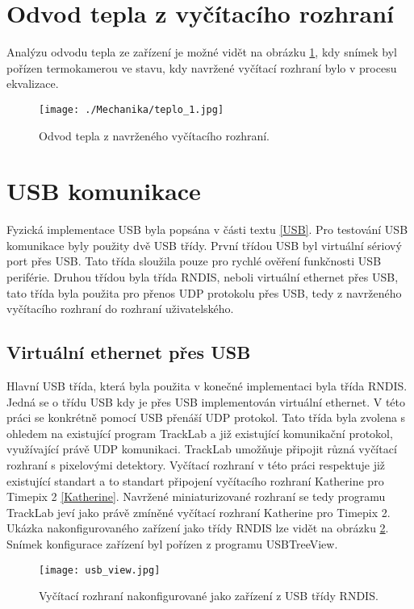 \section{Odvod tepla z vyčítacího rozhraní}
Analýzu odvodu tepla ze zařízení je možné vidět na obrázku \ref{fig:teplo}, kdy snímek byl pořízen termokamerou ve stavu, kdy navržené vyčítací rozhraní bylo v procesu ekvalizace.
\begin{figure}[h!]
	\centering
	\captionsetup{justification=centering}
	\texttt{[image: ./Mechanika/teplo\_1.jpg]}
	\caption{Odvod tepla z navrženého vyčítacího rozhraní.} 
	\label{fig:teplo}
\end{figure}

\section{USB komunikace}
Fyzická implementace USB byla popsána v části textu \ref{USB}. Pro testování USB komunikace byly použity dvě USB třídy. První třídou USB byl virtuální sériový port přes USB. Tato třída sloužila pouze pro rychlé ověření funkčnosti USB periférie. Druhou třídou byla třída RNDIS, neboli virtuální ethernet přes USB, tato třída byla použita pro přenos UDP protokolu přes USB, tedy z navrženého vyčítacího rozhraní do rozhraní uživatelského.
\subsection{Virtuální ethernet přes USB}
Hlavní USB třída, která byla použita v konečné implementaci byla třída RNDIS. Jedná se o třídu USB kdy je přes USB implementován virtuální ethernet. V této práci se konkrétně pomocí USB přenáší UDP protokol. Tato třída byla zvolena s ohledem na existující program TrackLab \cite{Manek_2024} a již existující komunikační protokol, využívající právě UDP komunikaci. TrackLab umožňuje připojit různá vyčítací rozhraní s pixelovými detektory. Vyčítací rozhraní v této práci respektuje již existující standart a to standart připojení vyčítacího rozhraní Katherine pro Timepix 2 \ref{Katherine}. Navržené miniaturizované rozhraní se tedy programu TrackLab jeví jako právě zmíněné vyčítací rozhraní Katherine pro Timepix 2. Ukázka nakonfigurovaného zařízení jako třídy RNDIS lze vidět na obrázku \ref{fig:RNDIS}. Snímek konfigurace zařízení byl pořízen z programu USBTreeView. 
\begin{figure}[h!]
	\centering
	\captionsetup{justification=centering}
	\texttt{[image: usb\_view.jpg]}
	\caption{Vyčítací rozhraní nakonfigurované jako zařízení z USB třídy RNDIS.} 
	\label{fig:RNDIS}
\end{figure}

